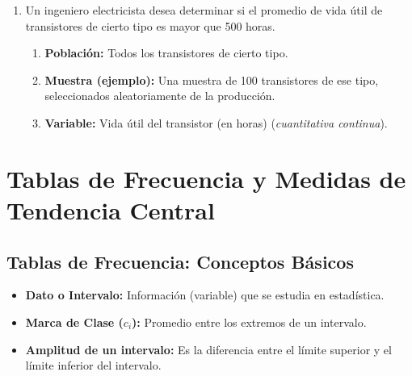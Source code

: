 \documentclass[12pt, letterpaper]{article}
\begin{document}
\begin{enumerate}
	      \begin{enumerate}
		      \item \textbf{Población:} Personas que se han recuperado de la enfermedad infecciosa por primera vez.
		      \item \textbf{Muestra (ejemplo):} Pacientes recuperados seleccionados de registros médicos de diversos hospitales.
		      \item \textbf{Variable:} Tiempo hasta la recurrencia de la enfermedad (\textit{cuantitativa continua}).
	      \end{enumerate}
	\item Un ingeniero electricista desea determinar si el promedio de vida útil de transistores de cierto tipo es mayor que 500 horas.
	      \begin{enumerate}
		      \item \textbf{Población:} Todos los transistores de cierto tipo.
		      \item \textbf{Muestra (ejemplo):} Una muestra de 100 transistores de ese tipo, seleccionados aleatoriamente de la producción.
		      \item \textbf{Variable:} Vida útil del transistor (en horas) (\textit{cuantitativa continua}).
	      \end{enumerate}
\end{enumerate}
\newpage

\section{Tablas de Frecuencia y Medidas de Tendencia Central}
\subsection{Tablas de Frecuencia: Conceptos Básicos}
\begin{itemize}
	\item \textbf{Dato o Intervalo:} Información (variable) que se estudia en estadística.
	\item \textbf{Marca de Clase ($c_i$):} Promedio entre los extremos de un intervalo.
	\item \textbf{Amplitud de un intervalo:} Es la diferencia entre el límite superior y el límite inferior del intervalo.
\end{itemize}
\end{document}

